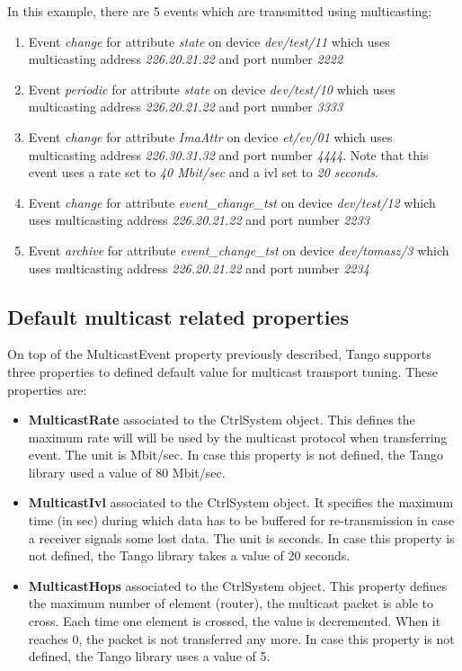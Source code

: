 In this example, there are 5 events which are transmitted using multicasting:
\begin{enumerate}
\item Event \emph{change} for attribute \emph{state} on device \emph{dev/test/11}
which uses multicasting address \emph{226.20.21.22} and port number
\emph{2222}
\item Event \emph{periodic} for attribute \emph{state} on device \emph{dev/test/10}
which uses multicasting address \emph{226.20.21.22} and port number
\emph{3333}
\item Event \emph{change} for attribute \emph{ImaAttr} on device \emph{et/ev/01}
which uses multicasting address \emph{226.30.31.32} and port number
\emph{4444}. Note that this event uses a rate set to \emph{40 Mbit/sec}
and a ivl set to \emph{20 seconds}.
\item Event \emph{change} for attribute \emph{event\_change\_tst} on device
\emph{dev/test/12} which uses multicasting address \emph{226.20.21.22}
and port number \emph{2233}
\item Event \emph{archive} for attribute \emph{event\_change\_tst} on device
\emph{dev/tomasz/3} which uses multicasting address \emph{226.20.21.22}
and port number \emph{2234}
\end{enumerate}

\subsection{Default multicast related properties}

On top of the MulticastEvent property previously described, Tango
supports three properties to defined default value for multicast transport
tuning. These properties are:
\begin{itemize}
\item \textbf{MulticastRate} associated to the CtrlSystem
object. This defines the maximum rate will will be used by the multicast
protocol when transferring event. The unit is Mbit/sec. In case this
property is not defined, the Tango library used a value of 80 Mbit/sec.
\item \textbf{MulticastIvl} associated to the CtrlSystem
object. It specifies the maximum time (in sec) during which data has
to be buffered for re-transmission in case a receiver signals some
lost data. The unit is seconds. In case this property is not defined,
the Tango library takes a value of 20 seconds.
\item \textbf{MulticastHops} associated to the CtrlSystem
object. This property defines the maximum number of element (router),
the multicast packet is able to cross. Each time one element is crossed,
the value is decremented. When it reaches 0, the packet is not transferred
any more. In case this property is not defined, the Tango library
uses a value of 5.
\end{itemize}

